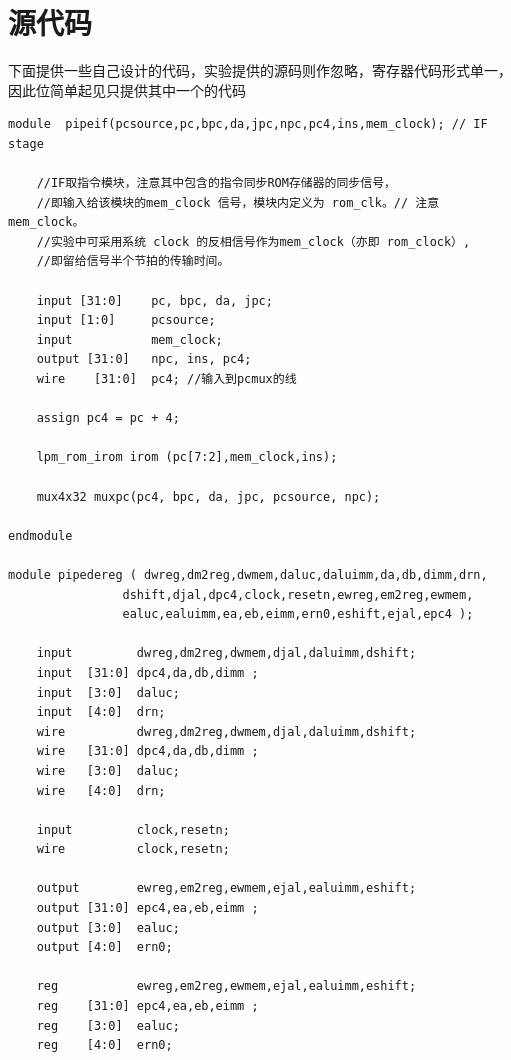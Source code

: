 \documentclass[UTF8]{ctexart}
\begin{document}
\section{源代码}
下面提供一些自己设计的代码，实验提供的源码则作忽略，寄存器代码形式单一，因此位简单起见只提供其中一个的代码
\begin{verbatim}
module 	pipeif(pcsource,pc,bpc,da,jpc,npc,pc4,ins,mem_clock); // IF stage

    //IF取指令模块，注意其中包含的指令同步ROM存储器的同步信号，
    //即输入给该模块的mem_clock 信号，模块内定义为 rom_clk。// 注意 mem_clock。
    //实验中可采用系统 clock 的反相信号作为mem_clock（亦即 rom_clock）,
    //即留给信号半个节拍的传输时间。

    input [31:0] 	pc, bpc, da, jpc;
    input [1:0]		pcsource;
    input 			mem_clock;
    output [31:0] 	npc, ins, pc4;
    wire 	[31:0] 	pc4; //输入到pcmux的线

    assign pc4 = pc + 4;

    lpm_rom_irom irom (pc[7:2],mem_clock,ins);

    mux4x32 muxpc(pc4, bpc, da, jpc, pcsource, npc);

endmodule

module pipedereg ( dwreg,dm2reg,dwmem,daluc,daluimm,da,db,dimm,drn,
                dshift,djal,dpc4,clock,resetn,ewreg,em2reg,ewmem,
                ealuc,ealuimm,ea,eb,eimm,ern0,eshift,ejal,epc4 );

    input         dwreg,dm2reg,dwmem,djal,daluimm,dshift;
    input  [31:0] dpc4,da,db,dimm ;
    input  [3:0]  daluc;
    input  [4:0]  drn;
    wire          dwreg,dm2reg,dwmem,djal,daluimm,dshift;
    wire   [31:0] dpc4,da,db,dimm ;
    wire   [3:0]  daluc;
    wire   [4:0]  drn;

    input         clock,resetn;
    wire          clock,resetn;

    output        ewreg,em2reg,ewmem,ejal,ealuimm,eshift;
    output [31:0] epc4,ea,eb,eimm ;
    output [3:0]  ealuc;
    output [4:0]  ern0;

    reg           ewreg,em2reg,ewmem,ejal,ealuimm,eshift;
    reg    [31:0] epc4,ea,eb,eimm ;
    reg    [3:0]  ealuc;
    reg    [4:0]  ern0;


\end{verbatim}
\end{document}
